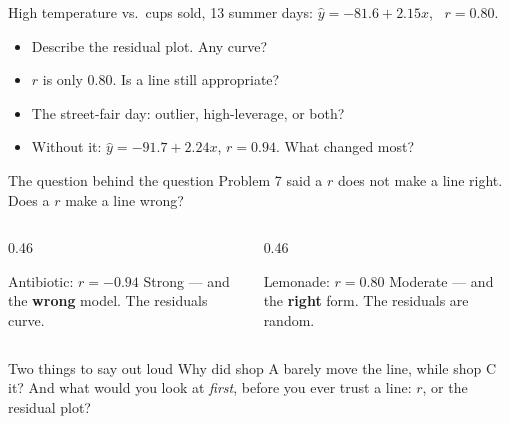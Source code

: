 \documentclass[aspectratio=169, 11pt]{beamer}
\begin{document}
\begin{frame}[t, plain]
  High temperature vs.\ cups sold, 13 summer days: $\hat{y} = -81.6 + 2.15x$, \ $r = 0.80$.
  \begin{itemize}\setlength{\itemsep}{5pt}
    \item Describe the residual plot. Any curve?
    \item $r$ is only 0.80. Is a line still appropriate?
    \item The street-fair day: outlier, high-leverage, or both?
    \item Without it: $\hat{y} = -91.7 + 2.24x$, $r = 0.94$. What changed most?
  \end{itemize}
  \begin{block}{The question behind the question}
    Problem 7 said a  $r$ does not make a line right. Does a  $r$
    make a line wrong?
  \end{block}
\end{frame}

\begin{frame}[t, plain]
  \vspace{6pt}
  \begin{columns}[t]
    \begin{column}{0.46\textwidth}
      \begin{block}{Antibiotic: $r = -0.94$}
        Strong --- and the \textbf{wrong} model. The residuals curve.
      \end{block}
    \end{column}
    \begin{column}{0.46\textwidth}
      \begin{block}{Lemonade: $r = 0.80$}
        Moderate --- and the \textbf{right} form. The residuals are random.
      \end{block}
    \end{column}
  \end{columns}
  \vspace{12pt}
  \begin{block}{Two things to say out loud}
    Why did shop A barely move the line, while shop C  it? And what would you
    look at \emph{first}, before you ever trust a line: $r$, or the residual plot?
  \end{block}
\end{frame}
\end{document}

